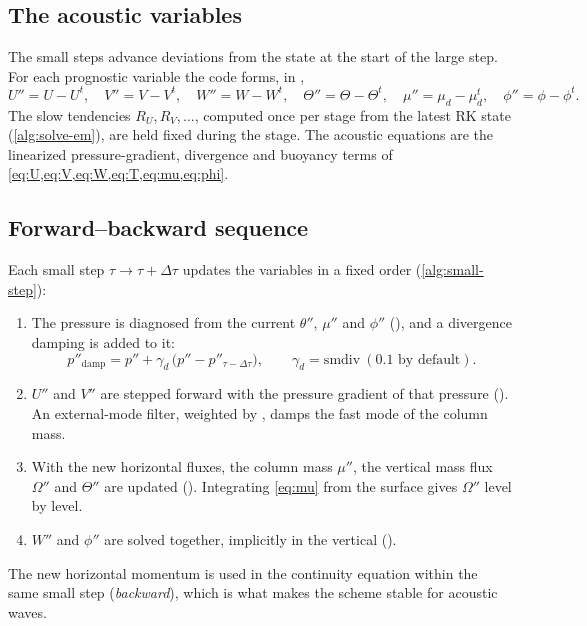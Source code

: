 \subsection{The acoustic variables}

The small steps advance deviations from the state at the start of the large step. For each prognostic variable the
code forms, in ,
\begin{equation}
  U'' = U - U^{t},\quad V'' = V - V^{t},\quad W'' = W - W^{t},\quad
  \Theta'' = \Theta - \Theta^{t},\quad \mu'' = \mu_d - \mu_d^{t},\quad \phi'' = \phi - \phi^{t}.
\end{equation}
The slow tendencies $R_U, R_V, \dots$, computed once per stage from the latest RK state (\cref{alg:solve-em}),
are held fixed during the stage. The acoustic equations are the linearized pressure-gradient, divergence and
buoyancy terms of \cref{eq:U,eq:V,eq:W,eq:T,eq:mu,eq:phi}.

\subsection{Forward--backward sequence}

Each small step $\tau \to \tau + \Delta\tau$ updates the variables in a fixed order (\cref{alg:small-step}):
\begin{enumerate}
  \item The pressure is diagnosed from the current $\theta''$, $\mu''$ and $\phi''$
    (), and a divergence damping is added to it:
    \begin{equation}
      p''_{\mathrm{damp}} = p'' + \gamma_d\,\bigl(p'' - p''_{\tau-\Delta\tau}\bigr), \qquad \gamma_d = \mathrm{smdiv}
      \ (0.1 \text{ by default}).
    \end{equation}
  \item $U''$ and $V''$ are stepped forward with the pressure gradient of that pressure
    (). An external-mode filter, weighted by , damps the
    fast mode of the column mass.
  \item With the new horizontal fluxes, the column mass $\mu''$, the vertical mass flux $\Omega''$ and $\Theta''$ are
    updated (). Integrating \cref{eq:mu} from the surface gives
    $\Omega''$ level by level.
  \item $W''$ and $\phi''$ are solved together, implicitly in the vertical
    ().
\end{enumerate}
The new horizontal momentum is used in the continuity equation within the same small step (\emph{backward}), which
is what makes the scheme stable for acoustic waves.

